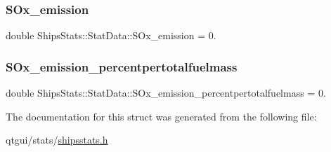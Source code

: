 \subsubsection{\texorpdfstring{SOx\_emission}{SOx\_emission}}
{\footnotesize\ttfamily double Ships\+Stats\+::\+Stat\+Data\+::\+S\+Ox\+\_\+emission = 0.}

\mbox{\label{struct_ships_stats_1_1_stat_data_a9c45e474611404b10a510cd9cbc7fcaf}} 
\subsubsection{\texorpdfstring{SOx\_emission\_percentpertotalfuelmass}{SOx\_emission\_percentpertotalfuelmass}}
{\footnotesize\ttfamily double Ships\+Stats\+::\+Stat\+Data\+::\+S\+Ox\+\_\+emission\+\_\+percentpertotalfuelmass = 0.}



The documentation for this struct was generated from the following file\+:\begin{DoxyCompactItemize}
\item 
qtgui/stats/\mbox{\hyperlink{shipsstats_8h}{shipsstats.\+h}}\end{DoxyCompactItemize}
